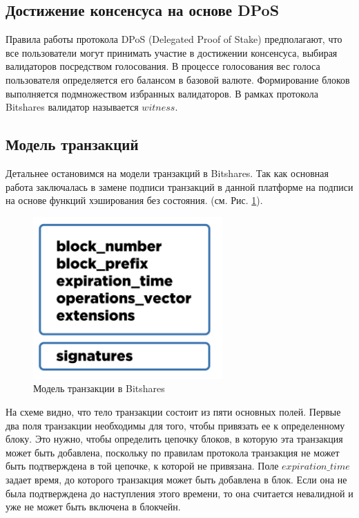 \documentclass[a4paper, 14pt]{extarticle}
\begin{document}
\subsection{Достижение консенсуса на основе DPoS}
Правила работы протокола DPoS (Delegated Proof of Stake) предполагают, что все пользователи могут принимать участие в достижении консенсуса, выбирая валидаторов посредством голосования. В процессе голосования вес голоса пользователя определяется его балансом в базовой валюте. Формирование блоков выполняется подмножеством избранных валидаторов. В рамках протокола Bitshares валидатор называется $witness$.

\subsection{Модель транзакций}
Детальнее остановимся на модели транзакций в Bitshares. Так как основная работа заключалась в замене подписи транзакций в данной платформе на подписи на основе функций хэширования без состояния. (см. Рис. \ref{fig:Bitshares_trx_model}).

\begin{figure}[h]
    \centering
    \includegraphics[scale=0.5]{Bitshares_trx_model.png}
    \caption{Модель транзакции в Bitshares}
    \label{fig:Bitshares_trx_model}
\end{figure}

На схеме видно, что тело транзакции состоит из пяти основных полей. Первые два поля транзакции необходимы для того, чтобы привязать ее к определенному блоку. Это нужно, чтобы определить цепочку блоков, в которую эта транзакция может быть добавлена, поскольку по правилам протокола транзакция не может быть подтверждена в той цепочке, к которой не привязана. Поле $expiration\_time$ задает время, до которого транзакция может быть добавлена в блок. Если она не была подтверждена до наступления этого времени, то она считается невалидной и уже не может быть включена в блокчейн.
\end{document}
